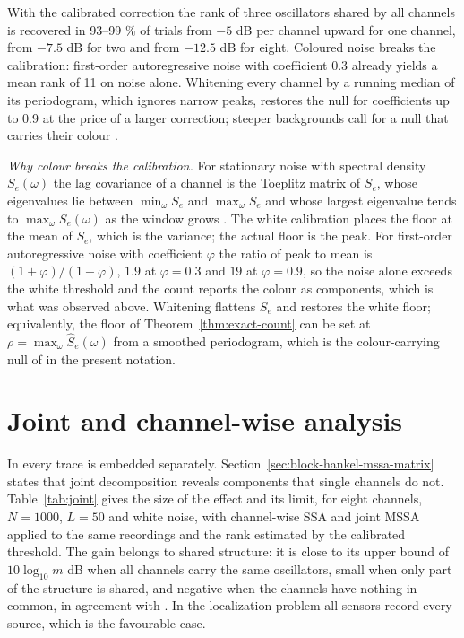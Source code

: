 \documentclass{article}
\begin{document}
With the calibrated correction the rank of three oscillators shared by all channels is recovered in 93--99 \% of trials from $-5$ dB per channel upward for one channel, from $-7.5$ dB for two and from $-12.5$ dB for eight. Coloured noise breaks the calibration: first-order autoregressive noise with coefficient 0.3 already yields a mean rank of 11 on noise alone. Whitening every channel by a running median of its periodogram, which ignores narrow peaks, restores the null for coefficients up to 0.9 at the price of a larger correction; steeper backgrounds call for a null that carries their colour \cite{ref-Allen}.

\emph{Why colour breaks the calibration.} For stationary noise with spectral density $S_e(\omega)$ the lag covariance of a channel is the Toeplitz matrix of $S_e$, whose eigenvalues lie between $\min_\omega S_e$ and $\max_\omega S_e$ and whose largest eigenvalue tends to $\max_\omega S_e(\omega)$ as the window grows \cite{ref-GrenanderSzego, ref-Gray}. The white calibration places the floor at the mean of $S_e$, which is the variance; the actual floor is the peak. For first-order autoregressive noise with coefficient $\varphi$ the ratio of peak to mean is $(1 + \varphi)/(1 - \varphi)$, $1.9$ at $\varphi = 0.3$ and $19$ at $\varphi = 0.9$, so the noise alone exceeds the white threshold and the count reports the colour as components, which is what was observed above. Whitening flattens $S_e$ and restores the white floor; equivalently, the floor of Theorem~\ref{thm:exact-count} can be set at $\rho = \max_\omega \widehat{S}_e(\omega)$ from a smoothed periodogram, which is the colour-carrying null of \cite{ref-Allen} in the present notation.

\section{Joint and channel-wise analysis}\label{app:joint-and-channel}

In \cite{ref-Bernadotte05} every trace is embedded separately. Section~\ref{sec:block-hankel-mssa-matrix} states that joint decomposition reveals components that single channels do not. Table~\ref{tab:joint} gives the size of the effect and its limit, for eight channels, $N = 1000$, $L = 50$ and white noise, with channel-wise SSA and joint MSSA applied to the same recordings and the rank estimated by the calibrated threshold. The gain belongs to shared structure: it is close to its upper bound of $10 \log_{10} m$ dB when all channels carry the same oscillators, small when only part of the structure is shared, and negative when the channels have nothing in common, in agreement with \cite{ref-Golyandina03}. In the localization problem all sensors record every source, which is the favourable case.
\end{document}
